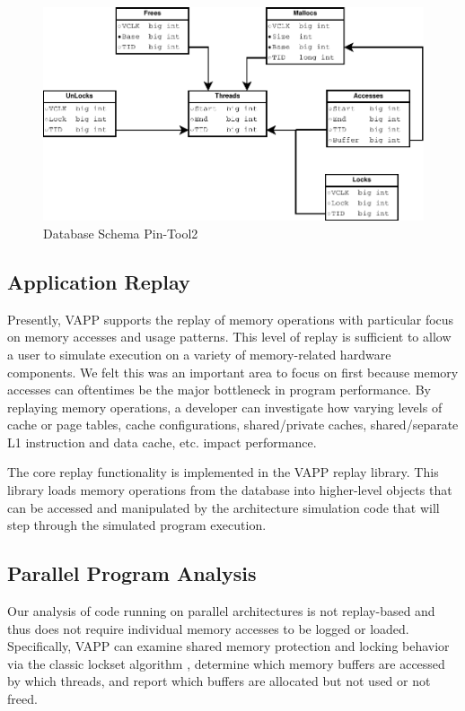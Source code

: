 \begin{figure}
  \includegraphics[width=\columnwidth]{database_schema2}
  \caption{Database Schema Pin-Tool2}
  \label{pic:db_schema2}
\end{figure}


\subsection{Application Replay}
Presently, VAPP supports the replay of memory operations with
particular focus on memory accesses and usage patterns.  This
level of replay is sufficient to allow a user to simulate
execution on a variety of memory-related hardware components.
We felt this was an important area to focus on first because
memory accesses can oftentimes be the major bottleneck in program
performance.  By replaying memory operations, a developer can
investigate how varying levels of cache or page tables, cache 
configurations, shared/private caches, shared/separate L1 instruction
and data cache, etc. impact performance.

The core replay functionality is implemented in the VAPP replay
library.  This library loads memory operations from the database
into higher-level objects that can be accessed and manipulated
by the architecture simulation code that will step through
the simulated program execution.

\subsection{Parallel Program Analysis}
Our analysis of code running on parallel architectures is
not replay-based and thus does not require individual memory
accesses to be logged or loaded.  Specifically, VAPP can
examine shared memory protection and locking behavior via
the classic lockset algorithm \cite{savage1997eraser},
determine which memory buffers are accessed by which threads,
and report which buffers are allocated but not used or not freed.

